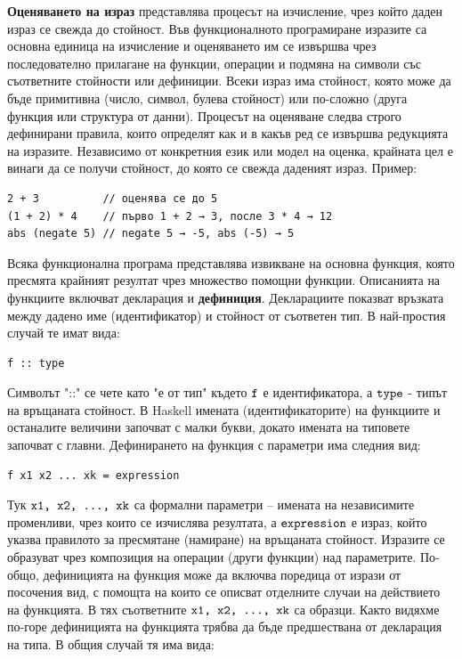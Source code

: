 \documentclass{article}
\newcommand{\cppplain}[1]{\textcolor{black}{\texttt{#1}}}
\begin{document}
\textbf{Оценяването на израз} представлява процесът на изчисление, чрез който даден израз се свежда до стойност. Във функционалното програмиране изразите са основна единица на изчисление
и оценяването им се извършва чрез последователно прилагане на функции, операции и подмяна на символи със съответните стойности или дефиниции. Всеки израз има стойност, която може да бъде
примитивна (число, символ, булева стойност) или по-сложно (друга функция или структура от данни). Процесът на оценяване следва строго дефинирани правила, които определят как и в какъв ред
се извършва редукцията на изразите. Независимо от конкретния език или модел на оценка, крайната цел е винаги да се получи стойност, до която се свежда даденият израз. Пример:
\begin{lstlisting}[style=cpp]
2 + 3          // оценява се до 5
(1 + 2) * 4    // първо 1 + 2 → 3, после 3 * 4 → 12
abs (negate 5) // negate 5 → -5, abs (-5) → 5
\end{lstlisting}
Всяка функционална програма представлява извикване на основна функция, която пресмята крайният резултат чрез множество помощни функции.
Описанията на функциите включват декларация и \textbf{дефиниция}. Декларациите показват връзката между дадено име (идентификатор) и стойност от съответен тип.
В най-простия случай те имат вида:
\begin{lstlisting}[style=cpp]
f :: type
\end{lstlisting}
Символът "::" се чете като "е от тип" където $\cppplain{f}$ е идентификатора, а $\cppplain{type}$ - типът на връщаната стойност. В Haskell имената (идентификаторите)
на функциите и останалите величини започват с малки букви, докато имената на типовете започват с главни. Дефинирането на функция с параметри има следния вид:
\begin{lstlisting}[style=cpp]
f x1 x2 ... xk = expression
\end{lstlisting}
Тук $\cppplain{x1, x2, ..., xk}$ са формални параметри – имената на независимите променливи, чрез които се изчислява резултата, а $\cppplain{expression}$ е израз, който указва правилото
за пресмятане (намиране) на връщаната стойност. Изразите се образуват чрез композиция на операции (други функции) над параметрите. По-общо, дефиницията на функция
може да включва поредица от изрази от посочения вид, с помощта на които се описват отделните случаи на действието на функцията. В тях съответните $\cppplain{x1, x2, ..., xk}$
са образци. Както видяхме по-горе дефиницията на функцията трябва да бъде предшествана от декларация на типа. В общия случай тя има вида:
\end{document}
